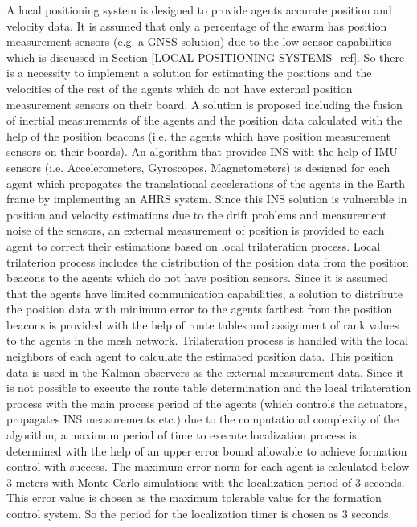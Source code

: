 A	local positioning system is designed to provide agents accurate position and velocity data. It is assumed that only a percentage of the swarm has position measurement sensors (e.g. a GNSS solution) due to the low sensor capabilities which is discussed in Section \ref{LOCAL POSITIONING SYSTEMS_ref}. So there is a necessity to implement a solution for estimating the positions and the velocities of the rest of the agents which do not have external position measurement sensors on their board.  A solution is proposed including the fusion of inertial measurements of the agents and the position data calculated with the help of the position beacons (i.e. the agents which have position measurement sensors on their boards). An algorithm that provides INS with the help of IMU sensors (i.e. Accelerometers, Gyroscopes, Magnetometers) is designed for each agent which propagates the translational accelerations of the agents in the Earth frame by implementing an AHRS system. Since this INS solution is vulnerable in position and velocity estimations due to the drift problems and measurement noise of the sensors, an external measurement of position is provided to each agent to correct their estimations based on local trilateration process. Local trilaterion process includes the distribution of the position data from the position beacons to the agents which do not have position sensors. Since it is assumed that the agents have limited communication capabilities, a solution to distribute the position data with minimum error to the agents farthest from the position beacons is provided with the help of route tables and assignment of rank values to the agents in the mesh network. Trilateration process is handled with the local neighbors of each agent to calculate the estimated position data. This position data is used in the Kalman observers as the external measurement data. Since it is not possible to execute the route table determination and the local trilateration process with the main process period of the agents (which controls the actuators, propagates INS measurements etc.) due to the computational complexity of the algorithm, a maximum period of time to execute localization process is determined with the help of an upper error bound allowable to achieve formation control with success. The maximum error norm for each agent is calculated below 3 meters with Monte Carlo simulations with the localization period of 3 seconds. This error value is chosen as the maximum tolerable value for the formation control system. So the period for the localization timer is chosen as 3 seconds.
       
